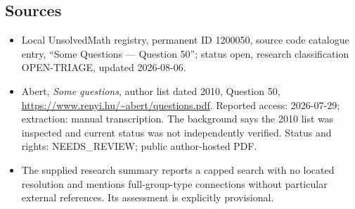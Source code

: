 \documentclass[11pt]{article}
\begin{document}
\subsection{Sources}
\begin{itemize}
\item Local UnsolvedMath registry, permanent ID 1200050, source code catalogue entry, ``Some Questions --- Question 50''; status open, research classification OPEN-TRIAGE, updated 2026-08-06.
\item Abert, \emph{Some questions}, author list dated 2010, Question 50, \url{https://www.renyi.hu/~abert/questions.pdf}. Reported access: 2026-07-29; extraction: manual transcription. The background says the 2010 list was inspected and current status was not independently verified. Status and rights: NEEDS\_REVIEW; public author-hosted PDF.
\item The supplied research summary reports a capped search with no located resolution and mentions full-group-type connections without particular external references. Its assessment is explicitly provisional.
\end{itemize}
\end{document}

